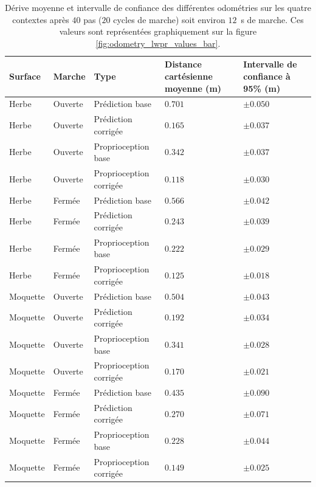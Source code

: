 \begin{table}[htb!]
    \centerfloat
    \small
    \begin{tabular}{|l|l|l|p{2.5cm}|p{2.5cm}|}
        \hline
        Surface & Marche & Type & Distance cartésienne moyenne (m) & Intervalle de confiance à 95\% (m)\\
        \hline
        Herbe & Ouverte & Prédiction base & $0.701$ & $\pm0.050$\\
        Herbe & Ouverte & Prédiction corrigée & $0.165$ & $\pm0.037$\\
        Herbe & Ouverte & Proprioception base & $0.342$ & $\pm0.037$\\
        Herbe & Ouverte & Proprioception corrigée & $0.118$ & $\pm0.030$\\
        \hline
        Herbe & Fermée & Prédiction base & $0.566$ & $\pm0.042$\\
        Herbe & Fermée & Prédiction corrigée & $0.243$ & $\pm0.039$\\
        Herbe & Fermée & Proprioception base & $0.222$ & $\pm0.029$\\
        Herbe & Fermée & Proprioception corrigée & $0.125$ & $\pm0.018$\\
        \hline
        Moquette & Ouverte & Prédiction base & $0.504$ & $\pm0.043$\\
        Moquette & Ouverte & Prédiction corrigée & $0.192$ & $\pm0.034$\\
        Moquette & Ouverte & Proprioception base & $0.341$ & $\pm0.028$\\
        Moquette & Ouverte & Proprioception corrigée & $0.170$ & $\pm0.021$\\
        \hline
        Moquette & Fermée & Prédiction base & $0.435$ & $\pm0.090$\\
        Moquette & Fermée & Prédiction corrigée & $0.270$ & $\pm0.071$\\
        Moquette & Fermée & Proprioception base & $0.228$ & $\pm0.044$\\
        Moquette & Fermée & Proprioception corrigée & $0.149$ & $\pm0.025$\\
        \hline
    \end{tabular}
    \caption{\label{tab:odometry_lwpr_values}
        Dérive moyenne et intervalle de confiance des différentes odométries sur 
        les quatre contextes après $40$ pas ($20$ cycles de marche)
        soit environ $12$~s de marche.
        Ces valeurs sont représentées graphiquement sur 
        la figure \ref{fig:odometry_lwpr_values_bar}.
    }
\end{table}


